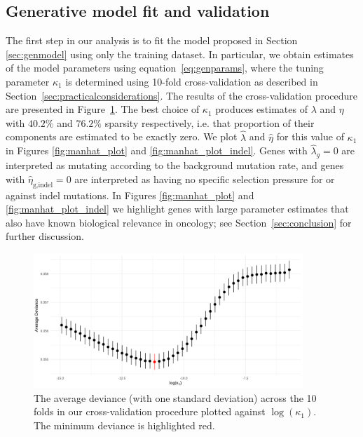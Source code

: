\documentclass[10pt,twoside,openright]{report}
\begin{document}
\subsection{Generative model fit and validation \label{sec:genmodelfit}}
The first step in our analysis is to fit the model proposed in Section \ref{sec:genmodel} using only the training dataset. In particular, we obtain estimates of the model parameters using equation~\eqref{eq:genparams}, where the tuning parameter $\kappa_1$ is determined using 10-fold cross-validation as described in Section~\ref{sec:practicalconsiderations}.  The results of the cross-validation procedure are presented in Figure~\ref{fig:genmodelstats}. The best choice of $\kappa_1$ produces estimates of $\lambda$ and $\eta$ with $40.2\%$ and $76.2\%$ sparsity respectively, i.e. that proportion of their components are estimated to be exactly zero. We plot $\hat{\lambda}$ and $\hat{\eta}$ for this value of $\kappa_1$ in Figures \ref{fig:manhat_plot} and \ref{fig:manhat_plot_indel}. Genes with $\hat{\lambda}_g = 0$ are interpreted as mutating according to the background mutation rate, and genes with $\hat{\eta}_{\text{g,indel}} = 0$ are interpreted as having no specific selection pressure for or against indel mutations. In Figures \ref{fig:manhat_plot} and \ref{fig:manhat_plot_indel} we highlight genes with large parameter estimates that also have known biological relevance in oncology; see Section~\ref{sec:conclusion} for further discussion.   
\begin{figure}[htbp]
\centering
\vspace*{-5mm}
\includegraphics[width=4in]{GenModelCV.png}
\vspace*{0mm}
\caption{The average deviance (with one standard deviation) across the 10 folds in our cross-validation procedure plotted against $\log(\kappa_1)$. The minimum deviance is highlighted red.\label{fig:genmodelstats}}
\vspace*{-2mm}
\end{figure}
\end{document}
